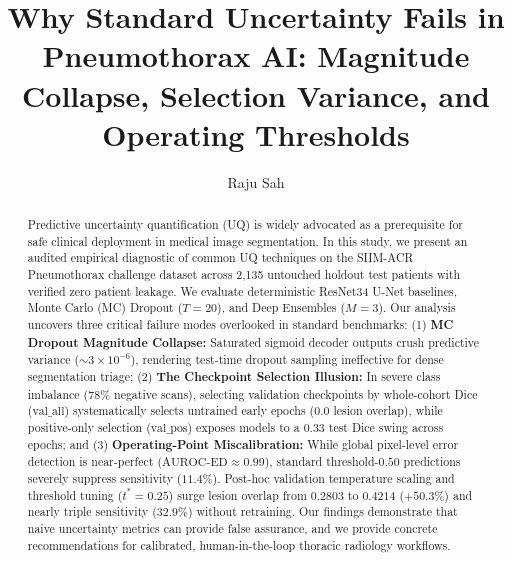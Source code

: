 \documentclass[runningheads]{llncs}
\begin{document}
\title{Why Standard Uncertainty Fails in Pneumothorax AI: Magnitude Collapse, Selection Variance, and Operating Thresholds}

\author{Raju Sah}

\maketitle

\begin{abstract}
Predictive uncertainty quantification (UQ) is widely advocated as a prerequisite for safe clinical deployment in medical image segmentation. In this study, we present an audited empirical diagnostic of common UQ techniques on the SIIM-ACR Pneumothorax challenge dataset across 2,135 untouched holdout test patients with verified zero patient leakage. We evaluate deterministic ResNet34 U-Net baselines, Monte Carlo (MC) Dropout ($T=20$), and Deep Ensembles ($M=3$). Our analysis uncovers three critical failure modes overlooked in standard benchmarks: (1) \textbf{MC Dropout Magnitude Collapse:} Saturated sigmoid decoder outputs crush predictive variance ($\sim 3 \times 10^{-6}$), rendering test-time dropout sampling ineffective for dense segmentation triage; (2) \textbf{The Checkpoint Selection Illusion:} In severe class imbalance ($78\%$ negative scans), selecting validation checkpoints by whole-cohort Dice ($\text{val\_all}$) systematically selects untrained early epochs ($0.0$ lesion overlap), while positive-only selection ($\text{val\_pos}$) exposes models to a $0.33$ test Dice swing across epochs; and (3) \textbf{Operating-Point Miscalibration:} While global pixel-level error detection is near-perfect ($\text{AUROC-ED} \approx 0.99$), standard threshold-$0.50$ predictions severely suppress sensitivity ($11.4\%$). Post-hoc validation temperature scaling and threshold tuning ($t^* = 0.25$) surge lesion overlap from $0.2803$ to $0.4214$ ($+50.3\%$) and nearly triple sensitivity ($32.9\%$) without retraining. Our findings demonstrate that naive uncertainty metrics can provide false assurance, and we provide concrete recommendations for calibrated, human-in-the-loop thoracic radiology workflows.

\end{abstract}
\end{document}
